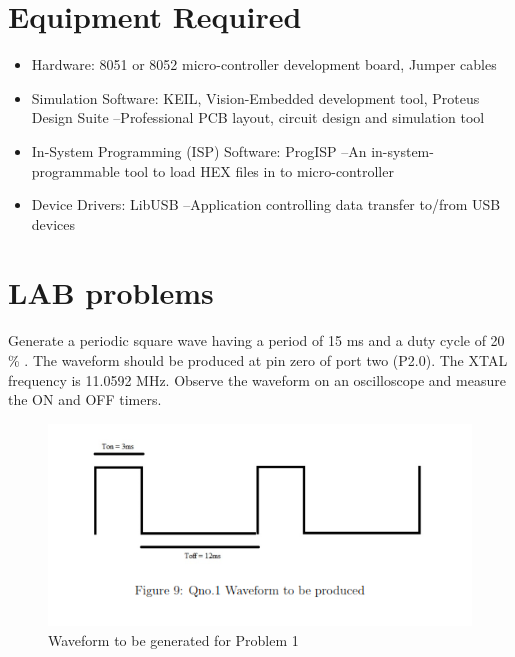 \documentclass{article}
\begin{document}
\section{Equipment Required}

\begin{itemize}
    \item Hardware:  8051 or 8052 micro-controller development board, Jumper cables

    \item Simulation  Software:  KEIL,  Vision-Embedded  development  tool, Proteus  Design Suite –Professional PCB layout, circuit design and simulation tool

    \item In-System Programming (ISP) Software: ProgISP –An in-system-programmable tool to load HEX  files in to micro-controller

    \item Device Drivers: LibUSB –Application controlling data transfer to/from USB devices
\end{itemize}


\pagebreak

\section{LAB problems}
\begin{Q}
    {
        Generate a periodic square wave having a period of 15 ms and a duty cycle of 20 \% . The waveform should be produced at pin zero of port two (P2.0). The XTAL frequency is 11.0592 MHz. Observe the waveform on an oscilloscope and measure the ON and OFF timers.
    }
\end{Q}

\begin{figure}[H]
    \centering
    \includegraphics[scale=0.89,cframe=blue 0.5pt 3pt]{1 output.png}
    \caption{Waveform to be generated for Problem 1}
\end{figure}
\end{document}

